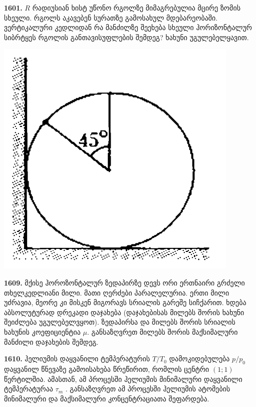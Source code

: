 \documentclass[12pt,a4paper,]{report}
\begin{document}
\textbf{1601.} $R$ რადიუსიან ხისტ უწონო რგოლზე მიმაგრებულია მცირე ზომის სხეული. რგოლს აკავებენ სურათზე გამოსახულ მდებარეობაში. ვერტიკალური კედლიდან რა მანძილზე შეეხება სხეული ჰორიზონტალურ სიბრტყეს რგოლის განთავისუფლების შემდეგ? ხახუნი უგულებელყავით.               
		\begin{center}
			\includegraphics[scale=0.4]{images/F1601.png}
		\end{center}
	
\textbf{1609.} მქისე ჰოროზონტალურ ზედაპირზე დევს ორი ერთნაირი გრძელი თხელკედლიანი მილი. მათი ღერძები პარალელურია. ერთი მილი უძრავია, მეორე კი მისკენ მიგორავს სრიალის გარეშე სიჩქარით. ხდება აბსოლუტურად დრეკადი დაჯახება (დაჯახებისას მილებს შორის ხახუნი შეიძლება უგულებელვყოთ). ზედაპირსა და მილებს შორის სრიალის ხახუნის კოეფიციენტია $\mu$. განსაზღვრეთ მილებს შორის მაქსიმალური მანძილი დაჯახების შემდეგ.

\textbf{1610.} ჰელიუმის  დაყვანილი ტემპერატურის $T/T_0$ დამოკიდებულება $p/p_0$ დაყვანილ წნევაზე გამოისახება წრეწირით, რომლის ცენტრი $(1; 1)$ წერტილშია. ამასთან, ამ პროცესში ჰელიუმის მინიმალური დაყვანილი ტემპერატურაა $\tau_m$ . განსაზღვრეთ ამ პროცესში ჰელიუმის ატომების მინიმალური და მაქსიმალური კონცენტრაციათა შეფარდება.
\end{document}
